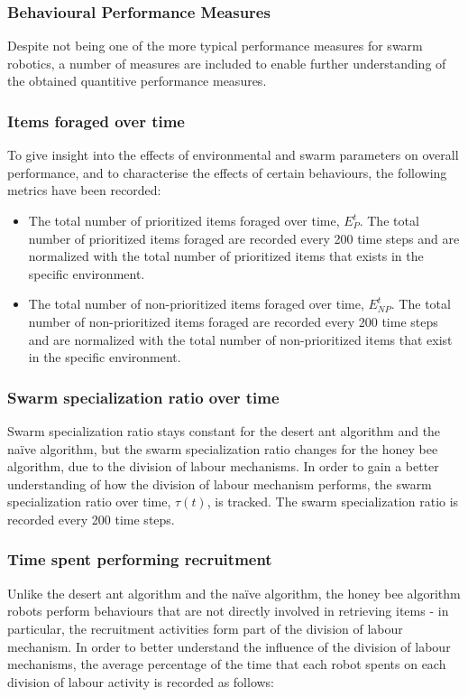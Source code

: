 \documentclass[preprint,12pt]{elsarticle}
\begin{document}
\subsubsection{Behavioural Performance Measures}
\label{behaviouralperformancemeasures}

Despite not being one of the more typical performance measures for swarm robotics, a number of measures are included to enable further understanding of the obtained quantitive performance measures.

\subsubsection{Items foraged over time}
To give insight into the effects of environmental and swarm parameters on overall performance, and to characterise the effects of certain behaviours, the following metrics have been recorded:

\begin{itemize}
\item The total number of prioritized items foraged over time, $E^t_P$. The total number of prioritized items foraged are recorded every 200 time steps and are normalized with the total number of prioritized items that exists in the specific environment.
\item The total number of non-prioritized items foraged over time, $E^t_{NP}$. The total number of non-prioritized items foraged are recorded every 200 time steps and are normalized with the total number of non-prioritized items that exist in the specific environment.
\end{itemize}

\subsubsection{Swarm specialization ratio over time}
Swarm specialization ratio stays constant for the desert ant algorithm and the na\"ive algorithm, but the swarm specialization ratio changes for the honey bee algorithm, due to the division of labour mechanisms. In order to gain a better understanding of how the division of labour mechanism performs, the swarm specialization ratio over time, $\tau(t)$, is tracked. The swarm specialization ratio is recorded every 200 time steps.

\subsubsection{Time spent performing recruitment}
Unlike the desert ant algorithm and the na\"ive algorithm, the honey bee algorithm robots perform behaviours that are not directly involved in retrieving items - in particular, the recruitment activities form part of the division of labour mechanism. In order to better understand the influence of the division of labour mechanisms, the average percentage of the time that each robot spents on each division of labour activity is recorded as follows:
\end{document}
